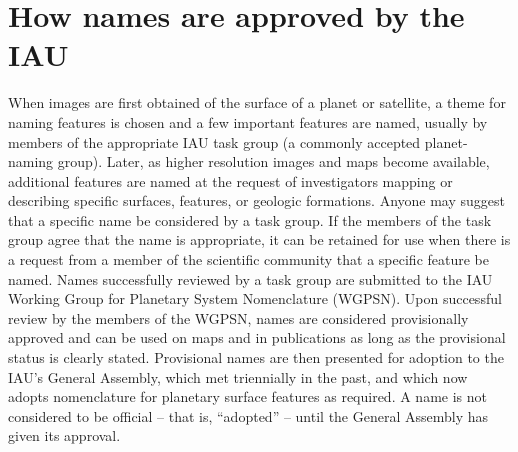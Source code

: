 \section{How names are approved by the IAU}
\label{sec:Nomenclature:ApprovingNames}
When images are first obtained of the surface of a planet or satellite, a theme for naming features is chosen 
and a few important features are named, usually by members of the appropriate IAU task group (a commonly 
accepted planet-naming group). Later, as higher resolution images and maps become available, additional 
features are named at the request of investigators mapping or describing specific surfaces, features, 
or geologic formations. Anyone may suggest that a specific name be considered by a task group. 
If the members of the task group agree that the name is appropriate, it can be retained for use 
when there is a request from a member of the scientific community that a specific feature be named. 
Names successfully reviewed by a task group are submitted to the IAU Working Group for Planetary System 
Nomenclature (WGPSN). 
Upon successful review by the members of the WGPSN, names are considered provisionally approved and can be 
used on maps and in publications as long as the provisional status is clearly stated. 
Provisional names are then presented for adoption to the IAU's General Assembly, which met triennially in the past, 
and which now adopts nomenclature for planetary surface features as required. A name is not considered to be 
official -- that is, ``adopted'' -- until the General Assembly has given its approval.

